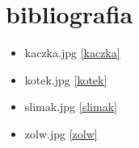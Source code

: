 \documentclass{beamer}
\begin{document}
\section{bibliografia}
\begin{itemize}
    \item kaczka.jpg \ref{kaczka}
    \item kotek.jpg \ref{kotek}
    \item slimak.jpg \ref{slimak}
    \item zolw.jpg \ref{zolw}
\end{itemize}
\end{document}
